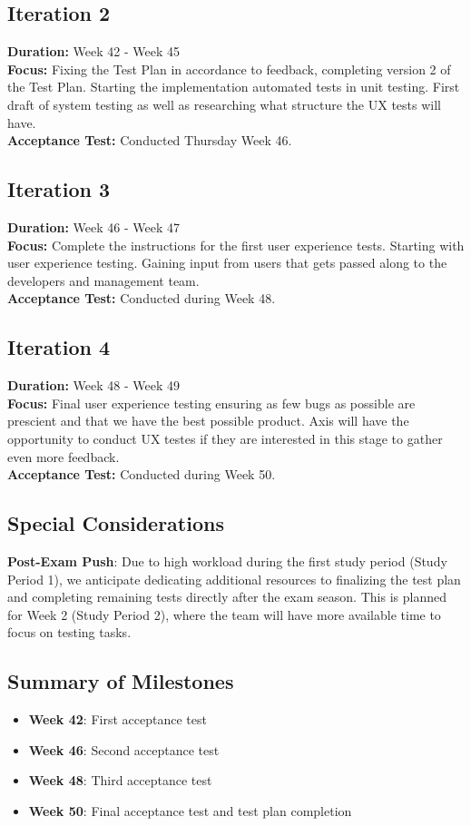 \documentclass{article}
\begin{document}
\subsection{Iteration 2}
\textbf{Duration:} Week 42 - Week 45 \\
\textbf{Focus:} Fixing the Test Plan in accordance to feedback, completing version 2 of the Test Plan. Starting the implementation automated tests in unit testing. First draft of system testing as well as researching what structure the UX tests will have. \\
\textbf{Acceptance Test:} Conducted Thursday Week 46.

\subsection{Iteration 3}
\textbf{Duration:} Week 46 - Week 47\\
\textbf{Focus:} Complete the instructions for the first user experience tests. Starting with user experience testing. Gaining input from users that gets passed along to the developers and management team. \\
\textbf{Acceptance Test:} Conducted during Week 48.

\subsection{Iteration 4}
\textbf{Duration:} Week 48 - Week 49\\
\textbf{Focus:} Final user experience testing ensuring as few bugs as possible are prescient and that we have the best possible product. Axis will have the opportunity to conduct UX testes if they are interested in this stage to gather even more feedback.  \\
\textbf{Acceptance Test:} Conducted during Week 50.

\subsection{Special Considerations}

\textbf{Post-Exam Push}: Due to high workload during the first study period (Study Period 1), we anticipate dedicating additional resources to finalizing the test plan and completing remaining tests directly after the exam season. This is planned for Week 2 (Study Period 2), where the team will have more available time to focus on testing tasks.

\subsection{Summary of Milestones}
\begin{itemize}
    \item \textbf{Week 42}: First acceptance test
    \item \textbf{Week 46}: Second acceptance test
    \item \textbf{Week 48}: Third acceptance test
    \item \textbf{Week 50}: Final acceptance test and test plan completion
\end{itemize}
\end{document}
